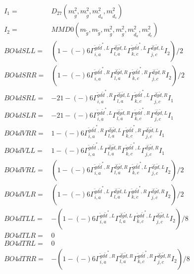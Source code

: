 \documentclass[A4,landscape]{article}
\begin{document}
\begin{align} 
I_1 = & D_{27}(m^2_{\tilde{g}}, m^2_{\tilde{g}}, m^2_{\tilde{d}_{{a}}}, m^2_{\tilde{d}_{{c}}}) \\ 
I_2 = & MMD0(m_{\tilde{g}}, m_{\tilde{g}}, m^2_{\tilde{g}}, m^2_{\tilde{g}}, m^2_{\tilde{d}_{{a}}}, m^2_{\tilde{d}_{{c}}}) \\ 
  BO4dSLL= & (  1
-(-)
  6 \Gamma^{\tilde{g} d \tilde{d}^*,L}_{i, a} \Gamma^{\bar{d}\tilde{g} \tilde{d} ,L}_{l, a} \Gamma^{\tilde{g} d \tilde{d}^*,L}_{k, c} \Gamma^{\bar{d}\tilde{g} \tilde{d} ,L}_{j, c} I_2)/2 \\ 
  BO4dSRR= & (  1
-(-)
  6 \Gamma^{\tilde{g} d \tilde{d}^*,R}_{i, a} \Gamma^{\bar{d}\tilde{g} \tilde{d} ,R}_{l, a} \Gamma^{\tilde{g} d \tilde{d}^*,R}_{k, c} \Gamma^{\bar{d}\tilde{g} \tilde{d} ,R}_{j, c} I_2)/2 \\ 
  BO4dSRL= & -2   1
-(-)
  6 \Gamma^{\tilde{g} d \tilde{d}^*,R}_{i, a} \Gamma^{\bar{d}\tilde{g} \tilde{d} ,L}_{l, a} \Gamma^{\tilde{g} d \tilde{d}^*,L}_{k, c} \Gamma^{\bar{d}\tilde{g} \tilde{d} ,R}_{j, c} I_1 \\ 
  BO4dSLR= & -2   1
-(-)
  6 \Gamma^{\tilde{g} d \tilde{d}^*,L}_{i, a} \Gamma^{\bar{d}\tilde{g} \tilde{d} ,R}_{l, a} \Gamma^{\tilde{g} d \tilde{d}^*,R}_{k, c} \Gamma^{\bar{d}\tilde{g} \tilde{d} ,L}_{j, c} I_1 \\ 
  BO4dVRR= &   1
-(-)
  6 \Gamma^{\tilde{g} d \tilde{d}^*,R}_{i, a} \Gamma^{\bar{d}\tilde{g} \tilde{d} ,L}_{l, a} \Gamma^{\tilde{g} d \tilde{d}^*,R}_{k, c} \Gamma^{\bar{d}\tilde{g} \tilde{d} ,L}_{j, c} I_1 \\ 
  BO4dVLL= &   1
-(-)
  6 \Gamma^{\tilde{g} d \tilde{d}^*,L}_{i, a} \Gamma^{\bar{d}\tilde{g} \tilde{d} ,R}_{l, a} \Gamma^{\tilde{g} d \tilde{d}^*,L}_{k, c} \Gamma^{\bar{d}\tilde{g} \tilde{d} ,R}_{j, c} I_1 \\ 
  BO4dVRL= & (  1
-(-)
  6 \Gamma^{\tilde{g} d \tilde{d}^*,R}_{i, a} \Gamma^{\bar{d}\tilde{g} \tilde{d} ,R}_{l, a} \Gamma^{\tilde{g} d \tilde{d}^*,L}_{k, c} \Gamma^{\bar{d}\tilde{g} \tilde{d} ,L}_{j, c} I_2)/2 \\ 
  BO4dVLR= & (  1
-(-)
  6 \Gamma^{\tilde{g} d \tilde{d}^*,L}_{i, a} \Gamma^{\bar{d}\tilde{g} \tilde{d} ,L}_{l, a} \Gamma^{\tilde{g} d \tilde{d}^*,R}_{k, c} \Gamma^{\bar{d}\tilde{g} \tilde{d} ,R}_{j, c} I_2)/2 \\ 
  BO4dTLL= & -(  1
-(-)
  6 \Gamma^{\tilde{g} d \tilde{d}^*,L}_{i, a} \Gamma^{\bar{d}\tilde{g} \tilde{d} ,L}_{l, a} \Gamma^{\tilde{g} d \tilde{d}^*,L}_{k, c} \Gamma^{\bar{d}\tilde{g} \tilde{d} ,L}_{j, c} I_2)/8 \\ 
  BO4dTLR= & 0 \\ 
  BO4dTRL= & 0 \\ 
  BO4dTRR= & -(  1
-(-)
  6 \Gamma^{\tilde{g} d \tilde{d}^*,R}_{i, a} \Gamma^{\bar{d}\tilde{g} \tilde{d} ,R}_{l, a} \Gamma^{\tilde{g} d \tilde{d}^*,R}_{k, c} \Gamma^{\bar{d}\tilde{g} \tilde{d} ,R}_{j, c} I_2)/8 \\ 
\end{align} 
\end{document}
